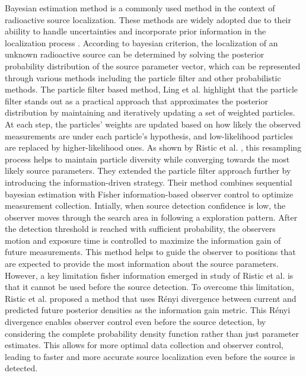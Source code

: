 \documentclass[../report.tex]{subfiles}
\begin{document}
    Bayesian estimation method is a commonly used method in the context of radioactive source localization. These methods are widely adopted due to their abiility to handle uncertainties and incorporate
    prior information in the localization process \cite{hu2024autonomous}. According to bayesian criterion, the localization of an unknown radioactive source can be determined by solving the posterior probability distribution
    of the source parameter vector, which can be represented through various methods including the particle filter \cite{Ristic2007AnIG} \cite{ristic2010information} \cite{ling2022multi} and other probabilistic methods. The particle filter based method, 
    Ling et al. \cite{ling2022multi} highlight that the particle filter stands out as a practical approach that approximates the posterior distribution by maintaining and iteratively updating a set of weighted
    particles. At each step, the particles' weights are updated based on how likely the observed measurements are under each particle's hypothesis, and low-likelihood particles are replaced by higher-likelihood ones. 
    As shown by Ristic et al. \cite{Ristic2007AnIG}, this resampling process helps to maintain particle diversity while converging towards the most likely source parameters. They extended the 
    particle filter approach further by introducing the information-driven strategy. Their method combines sequential bayesian estimation with Fisher information-based observer control to optimize measurement
    collection. Intially, when source detection confidence is low, the observer moves through the search area in following a exploration pattern. After the detection threshold is reached with sufficient
    probability, the observers motion and exposure time is controlled to maximize the information gain of future measurements. This method helps to guide the observer to positions that are expected
    to provide the most information about the source parameters. However, a key limitation fisher information emerged in study of Ristic et al. \cite{ristic2010information} is that it 
    cannot be used before the source detection. To overcome this limitation, Ristic et al. proposed a method that uses Rényi divergence between current and predicted future posterior densities as 
    the information gain metric. This Rényi divergence enables observer control even before the source detection, by considering the complete probability density function rather than just parameter estimates.
    This allows for more optimal data collection and observer control, leading to faster and more accurate source localization even before the source is detected. 
\end{document}
